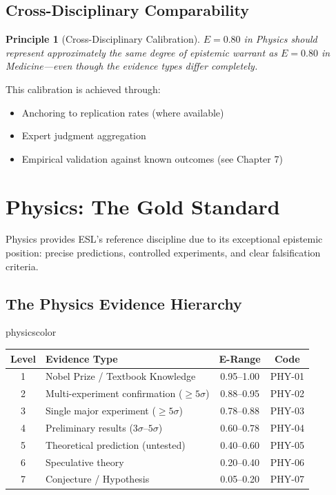 \documentclass[11pt,a4paper]{article}
\newtheorem{principle}{Principle}[section]
\theoremstyle{remark}
\begin{document}
\subsection{Cross-Disciplinary Comparability}

\begin{principle}[Cross-Disciplinary Calibration]
\label{princ:cross}
$E = 0.80$ in Physics should represent approximately the same degree of epistemic warrant as $E = 0.80$ in Medicine---even though the evidence types differ completely.
\end{principle}

This calibration is achieved through:
\begin{itemize}
    \item Anchoring to replication rates (where available)
    \item Expert judgment aggregation
    \item Empirical validation against known outcomes (see Chapter 7)
\end{itemize}


\section{Physics: The Gold Standard}
\label{sec:physics}

Physics provides ESL's reference discipline due to its exceptional epistemic position: precise predictions, controlled experiments, and clear falsification criteria.

\subsection{The Physics Evidence Hierarchy}

\begin{disciplinebox}{physicscolor}
\begin{center}
\begin{tabular}{clcc}
\toprule
\textbf{Level} & \textbf{Evidence Type} & \textbf{E-Range} & \textbf{Code} \\
\midrule
1 & Nobel Prize / Textbook Knowledge & 0.95--1.00 & PHY-01 \\
2 & Multi-experiment confirmation ($\geq 5\sigma$) & 0.88--0.95 & PHY-02 \\
3 & Single major experiment ($\geq 5\sigma$) & 0.78--0.88 & PHY-03 \\
4 & Preliminary results ($3\sigma$--$5\sigma$) & 0.60--0.78 & PHY-04 \\
5 & Theoretical prediction (untested) & 0.40--0.60 & PHY-05 \\
6 & Speculative theory & 0.20--0.40 & PHY-06 \\
7 & Conjecture / Hypothesis & 0.05--0.20 & PHY-07 \\
\bottomrule
\end{tabular}
\end{center}
\end{disciplinebox}
\end{document}
